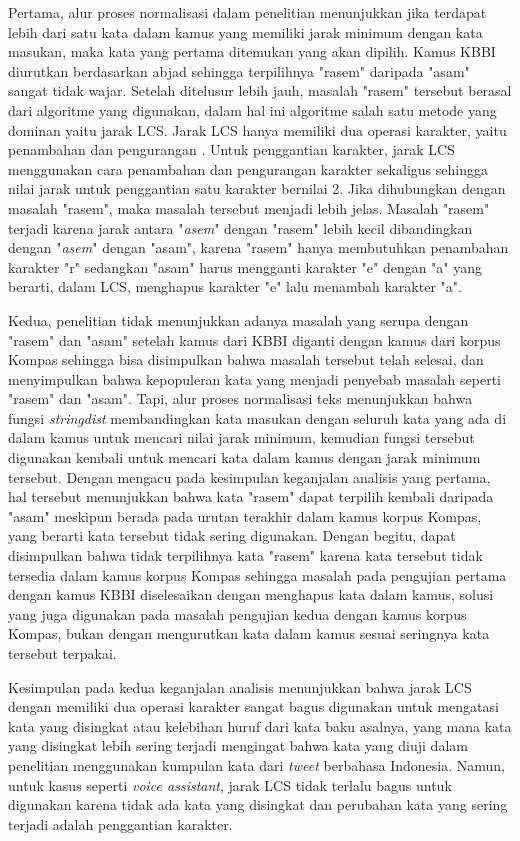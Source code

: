 Pertama, alur proses normalisasi dalam penelitian menunjukkan jika terdapat lebih dari satu kata dalam kamus yang memiliki jarak minimum dengan kata masukan, maka kata yang pertama ditemukan yang akan dipilih. Kamus KBBI diurutkan berdasarkan abjad sehingga terpilihnya "rasem" daripada "asam" sangat tidak wajar. Setelah ditelusur lebih jauh, masalah "rasem" tersebut berasal dari algoritme yang digunakan, dalam hal ini algoritme salah satu metode yang dominan yaitu jarak LCS. Jarak LCS hanya memiliki dua operasi karakter, yaitu penambahan dan pengurangan \parencite{van2014stringdist}. Untuk penggantian karakter, jarak LCS menggunakan cara penambahan dan pengurangan karakter sekaligus sehingga nilai jarak untuk penggantian satu karakter bernilai 2. Jika dihubungkan dengan masalah "rasem", maka masalah tersebut menjadi lebih jelas. Masalah "rasem" terjadi karena jarak antara "\textit{asem}" dengan "rasem" lebih kecil dibandingkan dengan "\textit{asem}" dengan "asam", karena "rasem" hanya membutuhkan penambahan karakter "r" sedangkan "asam" harus mengganti karakter "e" dengan "a" yang berarti, dalam LCS, menghapus karakter "e" lalu menambah karakter "a".

Kedua, penelitian tidak menunjukkan adanya masalah yang serupa dengan "rasem" dan "asam" setelah kamus dari KBBI diganti dengan kamus dari korpus Kompas sehingga bisa disimpulkan bahwa masalah tersebut telah selesai, dan menyimpulkan bahwa kepopuleran kata yang menjadi penyebab masalah seperti "rasem" dan "asam". Tapi, alur proses normalisasi teks menunjukkan bahwa fungsi \textit{stringdist} membandingkan kata masukan dengan seluruh kata yang ada di dalam kamus untuk mencari nilai jarak minimum, kemudian fungsi tersebut digunakan kembali untuk mencari kata dalam kamus dengan jarak minimum tersebut. Dengan mengacu pada kesimpulan keganjalan analisis yang pertama, hal tersebut menunjukkan bahwa kata "rasem" dapat terpilih kembali daripada "asam" meskipun berada pada urutan terakhir dalam kamus korpus Kompas, yang berarti kata tersebut tidak sering digunakan. Dengan begitu, dapat disimpulkan bahwa tidak terpilihnya kata "rasem" karena kata tersebut tidak tersedia dalam kamus korpus Kompas sehingga masalah pada pengujian pertama dengan kamus KBBI diselesaikan dengan menghapus kata dalam kamus, solusi yang juga digunakan pada masalah pengujian kedua dengan kamus korpus Kompas, bukan dengan mengurutkan kata dalam kamus sesuai seringnya kata tersebut terpakai.

Kesimpulan pada kedua keganjalan analisis menunjukkan bahwa jarak LCS dengan memiliki dua operasi karakter sangat bagus digunakan untuk mengatasi kata yang disingkat atau kelebihan huruf dari kata baku asalnya, yang mana kata yang disingkat lebih sering terjadi mengingat bahwa kata yang diuji dalam penelitian menggunakan kumpulan kata dari \textit{tweet} berbahasa Indonesia. Namun, untuk kasus seperti \textit{voice assistant}, jarak LCS tidak terlalu bagus untuk digunakan karena tidak ada kata yang disingkat dan perubahan kata yang sering terjadi adalah penggantian karakter.

